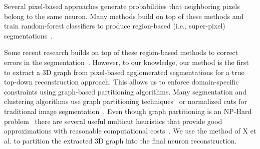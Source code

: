 Several pixel-based approaches generate probabilities that neighboring pixels belong to the same neuron.
Many methods build on top of these methods and train random-forest classifiers  to produce region-based (i.e., super-pixel) segmentations~\cite{seymour2016rhoananet,nunez2014graph,10.1371/journal.pone.0125825,parag2017anisotropic,zlateski2015image}. 


Some recent research builds on top of these region-based methods to correct errors in the segmentation~\cite{rolnick2017morphological,error_correction_using_CNN,haehn2017guided}.
However, to our knowledge, our method is the first to extract a 3D graph from pixel-based agglomerated segmentations for a true top-down reconstruction approach. This allows us to enforce domain-specific constraints using graph-based partitioning algorithms. Many segmentation and clustering algorithms use graph partitioning techniques~\cite{andres2012globally} or normalized cuts for traditional image segmentation~\cite{kappes2016higher,shi2000normalized,tatiraju2008image}.
Even though graph partitioning is an NP-Hard problem~\cite{demaine2006correlation} there are several useful multicut heuristics that provide good approximations with reasonable computational costs~\cite{horvnakova2017analysis,keuper2015efficient}. We use the method of X et al. to partition the extracted 3D graph into the final neuron reconstruction.

